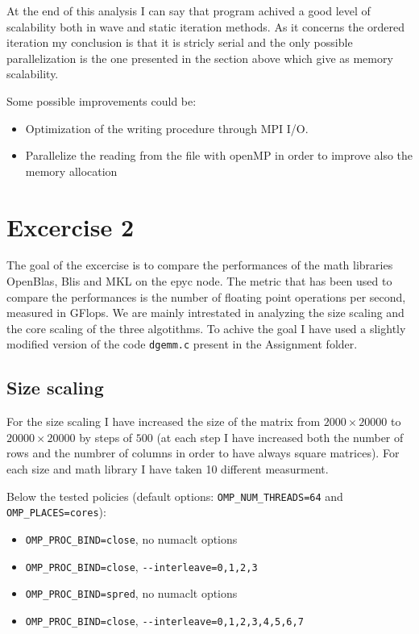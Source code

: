 \documentclass[
  letterpaper,
  DIV=11,
  numbers=noendperiod]{scrartcl}
\providecommand{\tightlist}{%
  \setlength{\itemsep}{0pt}\setlength{\parskip}{0pt}}\usepackage{longtable,booktabs,array}
\begin{document}
At the end of this analysis I can say that program achived a good level
of scalability both in wave and static iteration methods. As it concerns
the ordered iteration my conclusion is that it is stricly serial and the
only possible parallelization is the one presented in the section above
which give as memory scalability.

Some possible improvements could be:

\begin{itemize}
\tightlist
\item
  Optimization of the writing procedure through MPI I/O.
\item
  Parallelize the reading from the file with openMP in order to improve
  also the memory allocation
\end{itemize}

\hypertarget{excercise-2}{%
\section{Excercise 2}\label{excercise-2}}

The goal of the excercise is to compare the performances of the math
libraries OpenBlas, Blis and MKL on the epyc node. The metric that has
been used to compare the performances is the number of floating point
operations per second, measured in GFlops. We are mainly intrestated in
analyzing the size scaling and the core scaling of the three algotithms.
To achive the goal I have used a slightly modified version of the code
\texttt{dgemm.c} present in the Assignment folder.

\hypertarget{size-scaling}{%
\subsection{Size scaling}\label{size-scaling}}

For the size scaling I have increased the size of the matrix from
\(2000 \times 20000\) to \(20000 \times 20000\) by steps of \(500\) (at
each step I have increased both the number of rows and the numbrer of
columns in order to have always square matrices). For each size and math
library I have taken 10 different measurment.

Below the tested policies (default options:
\texttt{OMP\_NUM\_THREADS=64} and \texttt{OMP\_PLACES=cores}):

\begin{itemize}
\tightlist
\item
  \texttt{OMP\_PROC\_BIND=close}, no numaclt options
\item
  \texttt{OMP\_PROC\_BIND=close}, \texttt{-\/-interleave=0,1,2,3}
\item
  \texttt{OMP\_PROC\_BIND=spred}, no numaclt options
\item
  \texttt{OMP\_PROC\_BIND=close},
  \texttt{-\/-interleave=0,1,2,3,4,5,6,7}
\end{itemize}
\end{document}
